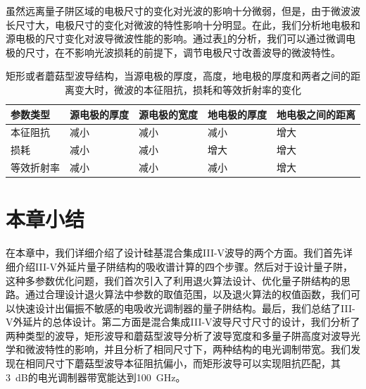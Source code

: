 虽然远离量子阱区域的电极尺寸的变化对光波的影响十分微弱，但是，由于微波波长尺寸大，电极尺寸的变化对微波的特性影响十分明显。在此，我们分析地电极和源电极的尺寸变化对波导微波性能的影响。通过表\ref{rect_metal_influence}的分析，我们可以通过微调电极的尺寸，在不影响光波损耗的前提下，调节电极尺寸改善波导的微波特性。	
{
	\begin{table}[htb]
		\caption{矩形或者蘑菇型波导结构，当源电极的厚度，高度，地电极的厚度和两者之间的距离变大时，微波的本征阻抗，损耗和等效折射率的变化}
		\label{rect_metal_influence}
		\centering
		\begin{tabular}[t]{lllll}
			\hline
			参数类型 &源电极的厚度 & 源电极的宽度 & 地电极的厚度& 地电极之间的距离 \\
			\hline
			本征阻抗 &   减小 & 减小 & 减小 &增大\\
			损耗  &   减小 & 减小 & 增大 &增大\\
			等效折射率 &  减小 & 减小 & 减小 &增大\\
			\hline
		\end{tabular}
	\end{table}
}

			
\section{本章小结}
在本章中，我们详细介绍了设计硅基混合集成III-V波导的两个方面。我们首先详细介绍III-V外延片量子阱结构的吸收谱计算的四个步骤。然后对于设计量子阱，这种多参数优化问题，我们首次引入了利用退火算法设计、优化量子阱结构的思路。通过合理设计退火算法中参数的取值范围，以及退火算法的权值函数，我们可以快速设计出偏振不敏感的电吸收光调制器的量子阱结构。最后，我们总结了III-V外延片的总体设计。第二方面是混合集成III-V波导尺寸尺寸的设计，我们分析了两种类型的波导，矩形波导和蘑菇型波导分析了波导宽度和多量子阱高度对波导光学和微波特性的影响，并且分析了相同尺寸下，两种结构的电光调制带宽。我们发现在相同尺寸下蘑菇型波导本征阻抗偏小，而矩形波导可以实现阻抗匹配，其3~dB的电光调制器带宽能达到100~GHz。